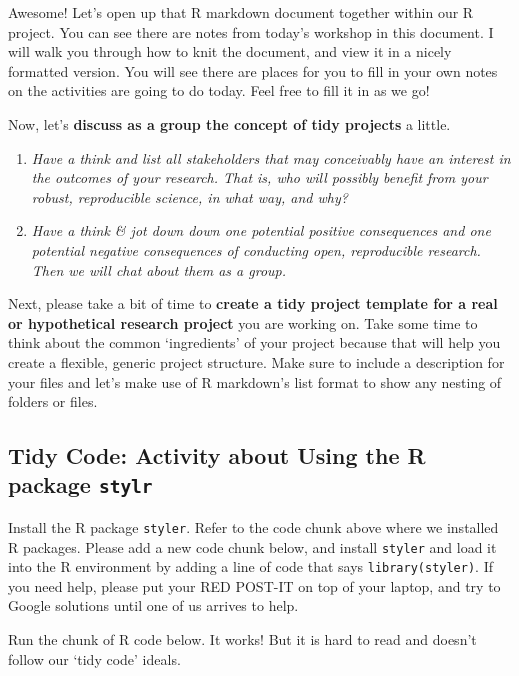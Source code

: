 \documentclass[
]{book}
\begin{document}
Awesome! Let's open up that R markdown document together within our R project. You can see there are notes from today's workshop in this document. I will walk you through how to knit the document, and view it in a nicely formatted version. You will see there are places for you to fill in your own notes on the activities are going to do today. Feel free to fill it in as we go!

Now, let's \textbf{discuss as a group the concept of tidy projects} a little.

\begin{enumerate}
\def\labelenumi{\arabic{enumi}.}
\item
  \emph{Have a think and list all stakeholders that may conceivably have an interest in the outcomes of your research. That is, who will possibly benefit from your robust, reproducible science, in what way, and why?}
\item
  \emph{Have a think \& jot down down one potential positive consequences and one potential negative consequences of conducting open, reproducible research. Then we will chat about them as a group.}
\end{enumerate}

Next, please take a bit of time to \textbf{create a tidy project template for a real or hypothetical research project} you are working on. Take some time to think about the common `ingredients' of your project because that will help you create a flexible, generic project structure. Make sure to include a description for your files and let's make use of R markdown's list format to show any nesting of folders or files.

\subsection{\texorpdfstring{Tidy Code: Activity about Using the R package \texttt{stylr}}{Tidy Code: Activity about Using the R package stylr}}\label{tidy-code-activity-about-using-the-r-package-stylr}

Install the R package \texttt{styler}. Refer to the code chunk above where we installed R packages. Please add a new code chunk below, and install \texttt{styler} and load it into the R environment by adding a line of code that says \texttt{library(styler)}. If you need help, please put your RED POST-IT on top of your laptop, and try to Google solutions until one of us arrives to help.

Run the chunk of R code below. It works! But it is hard to read and doesn't follow our `tidy code' ideals.
\end{document}
